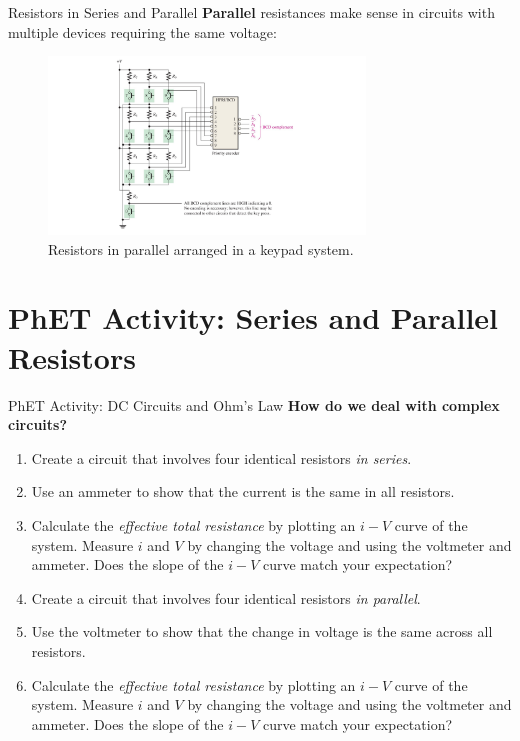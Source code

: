 \documentclass{beamer}
\begin{document}
\begin{frame}{Resistors in Series and Parallel}
\small
\textbf{\alert{Parallel}} resistances make sense in circuits with multiple devices requiring the same voltage:
\begin{figure}
\centering
\includegraphics[width=0.75\textwidth,trim=3cm 0cm 3cm 0cm,clip=true]{figures/encoder2.pdf}
\caption{\label{fig:house} Resistors in parallel arranged in a keypad system.}
\end{figure}
\end{frame}

\section{PhET Activity: Series and Parallel Resistors}

\begin{frame}{PhET Activity: DC Circuits and Ohm's Law}
\footnotesize
\textbf{How do we deal with complex circuits?}
\begin{enumerate}
\item Create a circuit that involves four identical resistors \textit{in series}.
\item Use an ammeter to show that the current is the same in all resistors.
\item Calculate the \textit{effective total resistance} by plotting an $i-V$ curve of the system.  Measure $i$ and $V$ by changing the voltage and using the voltmeter and ammeter.  Does the slope of the $i-V$ curve match your expectation?
\item Create a circuit that involves four identical resistors \textit{in parallel}.
\item Use the voltmeter to show that the change in voltage is the same across all resistors.
\item Calculate the \textit{effective total resistance} by plotting an $i-V$ curve of the system.  Measure $i$ and $V$ by changing the voltage and using the voltmeter and ammeter.   Does the slope of the $i-V$ curve match your expectation?
\end{enumerate}
\end{frame}
\end{document}
